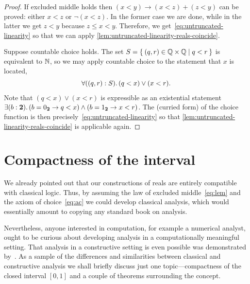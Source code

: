 \begin{proof}
  If excluded middle holds then $(x < y) \to (x < z) + (z < y)$ can be proved: either $x <
  z$ or $\lnot (x < z)$. In the former case we are done, while in the latter we get $z <
  y$ because $z \leq x < y$. Therefore, we get~\eqref{eq:untruncated-linearity} so that we
  can apply \cref{lem:untruncated-linearity-reals-coincide}.

  Suppose countable choice holds. The set $S = \setof{ \pairr{q, r} \in \Q \times \Q | q <
    r }$ is equivalent to $\mathbb{N}$, so we may apply countable choice to the statement that $x$
  is located,
  \begin{equation*}
    \fall{\pairr{q, r} : S} (q < x) \lor (x < r).
  \end{equation*}
  Note that $(q < x) \lor (x < r)$ is expressible as an existential statement $\exis{b :
    \bool} (b = \bfalse \to q < x) \land (b = \btrue \to x < r)$. The (curried form) of
  the choice function is then precisely~\eqref{eq:untruncated-linearity} so that
  \cref{lem:untruncated-linearity-reals-coincide} is applicable again.
\end{proof}

%
%
%


\section{Compactness of the interval}
\label{sec:compactness-interval}

%
%

We already pointed out that our constructions of reals are entirely compatible with
classical logic. Thus, by assuming the law of excluded middle~\eqref{eq:lem} and the axiom
of choice~\eqref{eq:ac} we could develop classical analysis, which would essentially
amount to copying any standard book on analysis.

%
%
Nevertheless, anyone interested in computation, for example a numerical analyst, ought to
be curious about developing analysis in a computationally meaningful setting. That
analysis in a constructive setting is even possible was demonstrated by~\cite{Bishop1967}.
As a sample of the differences and similarities between classical and constructive
analysis we shall briefly discuss just one topic---compactness of the closed interval
$[0,1]$ and a couple of theorems surrounding the concept.

